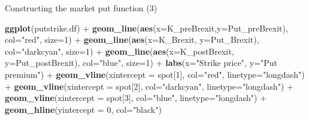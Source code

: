 \documentclass[ignorenonframetext,aspectratio=169]{beamer}
\newenvironment{Shaded}{}{}
\newcommand{\KeywordTok}[1]{\textcolor[rgb]{0.00,0.44,0.13}{\textbf{#1}}}
\newcommand{\DataTypeTok}[1]{\textcolor[rgb]{0.56,0.13,0.00}{#1}}
\newcommand{\DecValTok}[1]{\textcolor[rgb]{0.25,0.63,0.44}{#1}}
\newcommand{\StringTok}[1]{\textcolor[rgb]{0.25,0.44,0.63}{#1}}
\newcommand{\OperatorTok}[1]{\textcolor[rgb]{0.40,0.40,0.40}{#1}}
\newcommand{\NormalTok}[1]{#1}
\begin{document}
\begin{frame}[fragile]{Constructing the market put function (3)}

\begin{Shaded}
\begin{Highlighting}[]
\KeywordTok{ggplot}\NormalTok{(putstrike.df) }\OperatorTok{+}\StringTok{ }
\StringTok{  }\KeywordTok{geom_line}\NormalTok{(}\KeywordTok{aes}\NormalTok{(}\DataTypeTok{x=}\NormalTok{K_preBrexit,}\DataTypeTok{y=}\NormalTok{Put_preBrexit), }\DataTypeTok{col=}\StringTok{"red"}\NormalTok{, }\DataTypeTok{size=}\DecValTok{1}\NormalTok{) }\OperatorTok{+}\StringTok{ }
\StringTok{  }\KeywordTok{geom_line}\NormalTok{(}\KeywordTok{aes}\NormalTok{(}\DataTypeTok{x=}\NormalTok{K_Brexit, }\DataTypeTok{y=}\NormalTok{Put_Brexit), }\DataTypeTok{col=}\StringTok{"darkcyan"}\NormalTok{, }\DataTypeTok{size=}\DecValTok{1}\NormalTok{) }\OperatorTok{+}
\StringTok{  }\KeywordTok{geom_line}\NormalTok{(}\KeywordTok{aes}\NormalTok{(}\DataTypeTok{x=}\NormalTok{K_postBrexit, }\DataTypeTok{y=}\NormalTok{Put_postBrexit), }\DataTypeTok{col=}\StringTok{"blue"}\NormalTok{, }\DataTypeTok{size=}\DecValTok{1}\NormalTok{) }\OperatorTok{+}
\StringTok{  }\KeywordTok{labs}\NormalTok{(}\DataTypeTok{x=}\StringTok{"Strike price"}\NormalTok{, }\DataTypeTok{y=}\StringTok{"Put premium"}\NormalTok{) }\OperatorTok{+}\StringTok{ }
\StringTok{  }\KeywordTok{geom_vline}\NormalTok{(}\DataTypeTok{xintercept =}\NormalTok{ spot[}\DecValTok{1}\NormalTok{], }\DataTypeTok{col=}\StringTok{"red"}\NormalTok{, }\DataTypeTok{linetype=}\StringTok{"longdash"}\NormalTok{) }\OperatorTok{+}\StringTok{ }
\StringTok{  }\KeywordTok{geom_vline}\NormalTok{(}\DataTypeTok{xintercept =}\NormalTok{ spot[}\DecValTok{2}\NormalTok{], }\DataTypeTok{col=}\StringTok{"darkcyan"}\NormalTok{, }\DataTypeTok{linetype=}\StringTok{"longdash"}\NormalTok{) }\OperatorTok{+}
\StringTok{  }\KeywordTok{geom_vline}\NormalTok{(}\DataTypeTok{xintercept =}\NormalTok{ spot[}\DecValTok{3}\NormalTok{], }\DataTypeTok{col=}\StringTok{"blue"}\NormalTok{, }\DataTypeTok{linetype=}\StringTok{"longdash"}\NormalTok{) }\OperatorTok{+}
\StringTok{  }\KeywordTok{geom_hline}\NormalTok{(}\DataTypeTok{yintercept =} \DecValTok{0}\NormalTok{, }\DataTypeTok{col=}\StringTok{"black"}\NormalTok{)}
\end{Highlighting}
\end{Shaded}

\end{frame}
\end{document}
